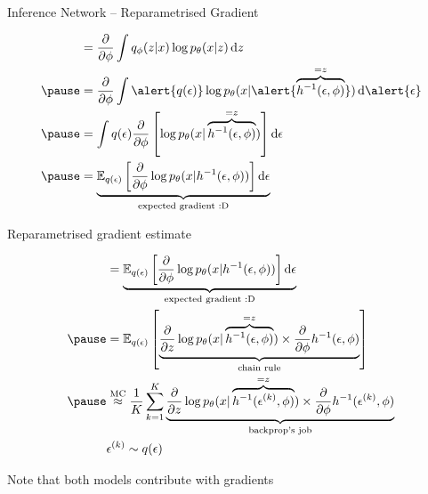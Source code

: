 \begin{frame}[plain]{Inference Network -- Reparametrised Gradient}

\begin{equation*}
\begin{aligned}
&= \pdv{\phi} \int q_\phi(z|x)\log p_\theta(x|z) \dd{z} \\ \pause
&= \pdv{\phi} \int \alert{q(\epsilon)} \log p_\theta(x | \alert{\overbrace{h^{-1}(\epsilon,\phi)}^{=z}}) \dd{\alert{\epsilon}} \\ \pause
&= \int q(\epsilon) \pdv{\phi} \left[ \log p_\theta(x| \overbrace{h^{-1}(\epsilon,\phi)}^{=z})\right] \dd{\epsilon} \\ \pause
&= \underbrace{\mathbb E_{q(\epsilon)}\left[ \pdv{\phi} \log p_\theta(x| h^{-1}(\epsilon,\phi))\right] \dd{\epsilon}}_{\text{expected gradient :D}} 
\end{aligned}
\end{equation*}
\end{frame}

\begin{frame}[plain]{Reparametrised gradient estimate}

\begin{equation*}
\begin{aligned}
&= \underbrace{\mathbb E_{q(\epsilon)}\left[ \pdv{\phi} \log p_\theta(x| h^{-1}(\epsilon,\phi))\right] \dd{\epsilon}}_{\text{expected gradient :D}} \\ \pause
&= \mathbb E_{q(\epsilon)} \left[ \underbrace{\pdv{z} \log p_\theta(x| \overbrace{h^{-1}(\epsilon,\phi)}^{=z}) \times \pdv{\phi} h^{-1}(\epsilon,\phi)}_{\text{chain rule}} \right] \\ \pause
&\overset{\text{MC}}{\approx} \frac{1}{K}\sum_{k=1}^{K} \underbrace{\pdv{z} \log p_\theta(x| \overbrace{h^{-1}(\epsilon^{(k)},\phi)}^{=z}) \times \pdv{\phi} h^{-1}(\epsilon^{(k)},\phi)}_{\text{backprop's job}}\\
&\epsilon^{(k)} \sim q(\epsilon)
\end{aligned}
\end{equation*}

Note that both models contribute with gradients

\end{frame}

